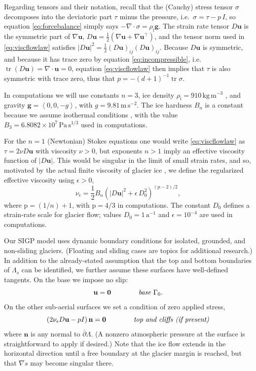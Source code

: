 \documentclass[letterpaper,final,12pt,reqno]{amsart}
\theoremstyle{claim}
\newcommand{\eps}{\epsilon}
\newcommand{\grad}{\nabla}
\newcommand{\Div}{\nabla\cdot}
\newcommand{\trace}{\operatorname{tr}}
\newcommand{\bg}{\mathbf{g}}
\newcommand{\bn}{\mathbf{n}}
\newcommand{\bu}{\mathbf{u}}
\newcommand{\bzero}{\bm{0}}
\newcommand{\rhoi}{\rho_{\text{i}}}
\newcommand{\pp}{{\text{p}}}
\numberwithin{equation}{section}
\numberwithin{figure}{section}
\numberwithin{table}{section}
\numberwithin{theorem}{section}
\begin{document}
Regarding tensors and their notation, recall that the (Cauchy) stress tensor $\sigma$ decomposes into the deviatoric part $\tau$ minus the pressure, i.e.~$\sigma = \tau - p\,I$, so equation \eqref{eq:forcebalance} simply says $-\Div \sigma = \rhoi \bg$.  The strain rate tensor $D\bu$ is the symmetric part of $\grad \bu$, $D\bu = \frac{1}{2} \left(\grad\bu + \grad\bu^\top\right)$, and the tensor norm used in \eqref{eq:viscflowlaw} satisfies $|D\bu|^2 = \frac{1}{2} (D\bu)_{ij} (D\bu)_{ij}$.  Because $D\bu$ is symmetric, and because it has trace zero by equation \eqref{eq:incompressible}, i.e.~$\trace(D\bu)=\nabla \cdot \bu = 0$, equation \eqref{eq:viscflowlaw} then implies that $\tau$ is also symmetric with trace zero, thus that $p=-(d+1)^{-1} \trace \sigma$.

In computations we will use constants $n=3$, ice density $\rhoi=910 \,\text{kg}\,\text{m}^{-3}$ \cite{Huybrechtsetal1996}, and gravity $\bg=\left<0,0,-g\right>$, with $g=9.81\,\text{m}\,\text{s}^{-2}$.  The ice hardness $B_n$ is a constant because we assume isothermal conditions \cite{GreveBlatter2009}, with the value $B_3=6.8082\times 10^7\,\text{Pa}\,\text{s}^{1/3}$ \cite{Huybrechtsetal1996} used in computations.

For the $n=1$ (Newtonian) Stokes equations one would write \eqref{eq:viscflowlaw} as $\tau = 2\nu D\bu$ with viscosity $\nu>0$, but exponents $n>1$ imply an effective viscosity function of $|D\bu|$.  This would be singular in the limit of small strain rates, and so, motivated by the actual finite viscosity of glacier ice \cite{GreveBlatter2009}, we define the regularized effective viscosity using $\eps>0$,
\begin{equation}
\nu_\eps = \frac{1}{2} B_n \left(|D\bu|^2 + \eps\, D_0^2\right)^{(\pp-2)/2}, \label{eq:regeffvisc}
\end{equation}
where $\pp=(1/n)+1$, with $\pp=4/3$ in computations.  The constant $D_0$ defines a strain-rate scale for glacier flow; values $D_0 = 1 \,\text{a}^{-1}$ and $\eps = 10^{-4}$ are used in computations.

Our SIGP model uses dynamic boundary conditions for isolated, grounded, and non-sliding glaciers.  (Floating and sliding cases are topics for additional research.)  In addition to the already-stated assumption that the top and bottom boundaries of $\Lambda_s$ can be identified, we further assume these surfaces have well-defined tangents.  On the base we impose no slip:
\begin{equation}
\bu = \bzero  \qquad\qquad \text{\emph{base} } \Gamma_0. \label{eq:basebc}
\end{equation}
On the other sub-aerial surfaces we set a condition of zero applied stress,
\begin{equation}
\left(2 \nu_\eps D\bu - pI\right) \bn = \bzero  \qquad \qquad \text{\emph{top and cliffs (if present)}} \label{eq:topbc}
\end{equation}
where $\bn$ is any normal to $\overline{\partial} \Lambda$.  (A nonzero atmospheric pressure at the surface is straightforward to apply if desired.)  Note that the ice flow extends in the horizontal direction until a free boundary at the glacier margin is reached, but that $\grad s$ may become singular there.
\end{document}

